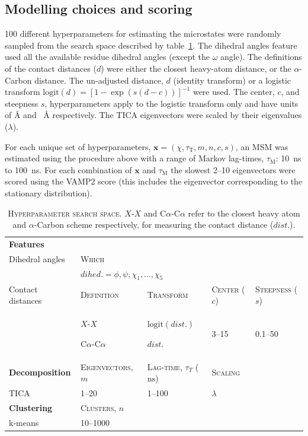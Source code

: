 \documentclass[journal=jacsat,manuscript=article]{achemso}
\newcommand{\nextitem}{\par\hspace*{\labelsep}\textbullet\hspace*{\labelsep}}
\begin{document}
\subsection{Modelling choices and scoring}
\num{100} different hyperparameters for estimating the microstates were randomly sampled from the search space described by table~\ref{tab:search_space}. The dihedral angles feature used all the available residue dihedral angles (except the $\omega$ angle). The definitions of the contact distances ($d$) were either the closest heavy-atom distance, or the $\alpha$-Carbon distance. The un-adjusted distance, $d$ (identity transform) or a  logistic transform $\mathrm{logit}(d) = [1-\exp{(s(d-c))}]^{-1}$ were used. The center, $c$, and steepness $s$, hyperparameters apply to the logistic transform only and have units of \si{\angstrom} and \si{\per\angstrom} respectively. The TICA eigenvectors were scaled by their eigenvalues ($\lambda$).

For each unique set of hyperparameters, $\mathbf{x} = (\chi, \tau_{\mathrm{T}}, m, n, c, s)$,  an MSM was estimated using the procedure above with a range of Markov lag-times, $\tau_{\mathrm{M}}$: \SI{10}{\nano\second} to \SI{100}{\nano\second}. For each combination of $\mathbf{x}$ and  $\tau_{\mathrm{M}}$ the slowest \numrange{2}{10} eigenvectors were scored using the VAMP2 score (this includes the eigenvector corresponding to the stationary distribution). 
\begin{table}
    \centering
    \begin{tabularx}{\textwidth}{lXXXX}
    \toprule
    \textbf{Features}  & & & &\\
    Dihedral angles & \textsc{Which} & & &\\
    & \multicolumn{2}{l}{$dihed.=\phi, \psi, \chi_{1}, \ldots, \chi_{5}$ } & & \\
    Contact distances &  \textsc{Definition} & \textsc{Transform}& \textsc{Center} ($c$) & \textsc{Steepness} ($s$) \\

     & \nextitem $X$-$X$  \nextitem C$\alpha$-C$\alpha$ & \nextitem $\mathrm{logit}(dist.)$ \nextitem $dist.$ &  \numrange{3}{15} & \numrange{0.1}{50} \\
    \midrule
    \textbf{Decomposition} & \textsc{Eigenvectors}, $m$ & \textsc{Lag-time}, $\tau_{T}$ ($\si{\nano\second}$) & \textsc{Scaling}\\ 
    TICA & \numrange{1}{20} & \numrange{1}{100} & $\lambda$\\
    \midrule
    \textbf{Clustering} & \textsc{Clusters}, $n$ &\\
    k-means & \numrange{10}{1000} & \\
    \bottomrule
    \end{tabularx}
    \caption{\textsc{Hyperparameter search space}. $X$-$X$ and C$\alpha$-C$\alpha$  refer to the closest heavy atom and $\alpha$-Carbon scheme respectively, for measuring the contact distance ($dist.$).  }
    \label{tab:search_space}
\end{table}
\end{document}
